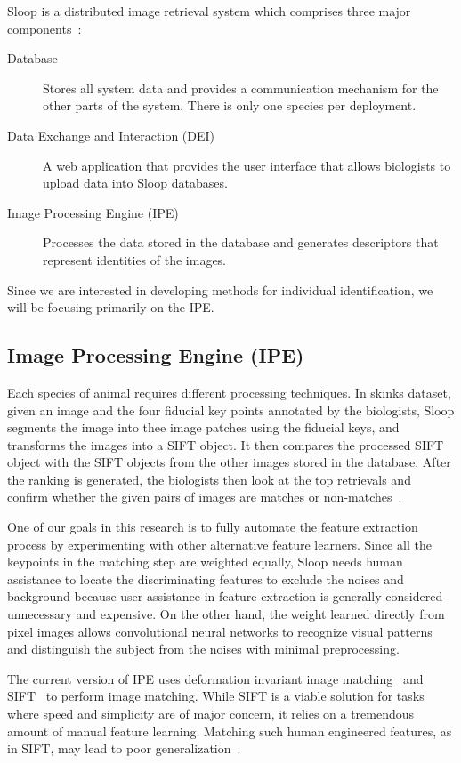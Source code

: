 Sloop is a distributed image retrieval system which comprises three major
components~\cite{sloop14,sloop15,sloopdocs}:
\begin{description}
\item[Database] Stores all system data and provides a communication mechanism
for the other parts of the system. There is only one species per deployment.
\item[Data Exchange and Interaction (DEI)] A web application that provides the
user interface that allows biologists to upload data into Sloop databases.
\item[Image Processing Engine (IPE)] Processes the data stored in the database
and generates descriptors that represent identities of the images.
\end{description}
Since we are interested in developing methods for individual
identification, we will be focusing primarily on the IPE.

\subsection{Image Processing Engine (IPE)}

Each species of animal requires different processing techniques.  In skinks
dataset, given an image and the four fiducial key points annotated by the
biologists, Sloop segments the image into thee image patches using the fiducial
keys, and transforms the images into a SIFT object. It then compares the
processed SIFT object with the SIFT objects from the other images stored in the
database. After the ranking is generated, the biologists then look at the top
retrievals and confirm whether the given pairs of images are matches or
non-matches~\cite{sloop14,sloop15}.

One of our goals in this research is to fully automate the feature extraction
process by experimenting with other alternative feature learners. Since all the
keypoints in the matching step are weighted equally, Sloop needs human
assistance to locate the discriminating features to exclude the noises and
background because user assistance in feature extraction is generally considered
unnecessary and expensive. On the other hand, the weight learned directly from
pixel images allows convolutional neural networks to recognize visual patterns
and distinguish the subject from the noises with minimal preprocessing.

The current version of IPE uses deformation invariant image
matching~\cite{yang09} and SIFT~\cite{lowe04} to perform image matching. While
SIFT is a viable solution for tasks where speed and simplicity are of major
concern, it relies on a tremendous amount of manual feature learning. Matching
such human engineered features, as in SIFT, may lead to poor
generalization~\cite{fisher14}.

